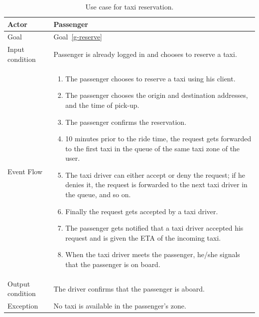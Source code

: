 \begin{table}
\begin{center}
\begin{tabular}{| l | p{} |}
\hline
Actor & Passenger \\
\hline
Goal & Goal~\ref{g-reserve}
\\
\hline
Input condition & Passenger is already logged in and chooses to reserve a taxi.  \\
\hline
Event Flow & \begin{enumerate}
	\item The passenger chooses to reserve a taxi using his client.
	\item The passenger chooses the origin and destination addresses, and the time of pick-up.
	\item The passenger confirms the reservation.
	\item 10 minutes prior to the ride time, the request gets forwarded to the first taxi in the queue of the same taxi zone of the user.
	\item The taxi driver can either accept or deny the request; if he denies it, the request is forwarded to the next taxi driver in the queue, and so on.
	\item Finally the request gets accepted by a taxi driver.
	\item The passenger gets notified that a taxi driver accepted his request and is given the ETA of the incoming taxi.
	\item When the taxi driver meets the passenger, he/she signals that the passenger is on board.
\end{enumerate}
\\
\hline
Output condition & The driver confirms that the passenger is aboard. \\
\hline
Exception & No taxi is available in the passenger's zone. \\
\hline
\end{tabular}
\end{center}
\caption{Use case for taxi reservation.}
\label{usecase-reservation}
\end{table}

